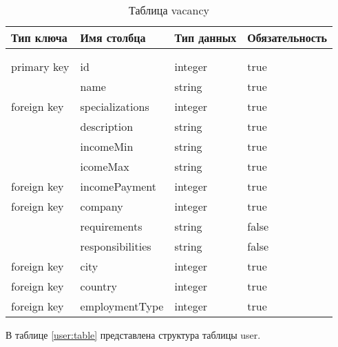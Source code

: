 \begin{xltabular}{\textwidth}{|l|l|p{1.7cm}|X|}
	\caption{Таблица vacancy \label{vacancy:table}}\\ \hline
	\centrow Тип ключа & \centrow Имя столбца & \centrow Тип
	данных & \centrow Обязательность \\ \hline
	 &  &  &  \\ \hline
	\endfirsthead
	 &  &  &  \\ \hline
	\finishhead
	primary key & id & integer & true \\ \hline 
	 & name & string & true \\ \hline 
	foreign key & specializations & integer & true \\ \hline 
	& description & string & true \\ \hline 
	& incomeMin & string & true \\ \hline 
	& icomeMax & string & true \\ \hline 
   foreign key & incomePayment & integer & true \\ \hline
	foreign key & company & integer & true \\ \hline
	& requirements & string & false \\ \hline
	& responsibilities & string & false \\ \hline
	foreign key & city & integer & true \\ \hline
	foreign key & country & integer & true \\ \hline
	foreign key & employmentType & integer & true \\ \hline
\end{xltabular}

В таблице \ref{user:table} представлена структура таблицы user.

